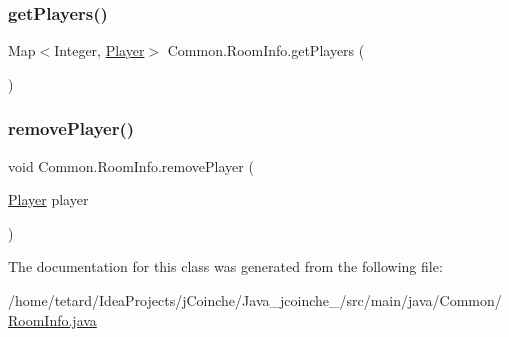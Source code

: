 \subsubsection{\texorpdfstring{get\+Players()}{getPlayers()}}
{\footnotesize\ttfamily Map$<$Integer, \mbox{\hyperlink{classCommon_1_1Player}{Player}}$>$ Common.\+Room\+Info.\+get\+Players (\begin{DoxyParamCaption}{ }\end{DoxyParamCaption})\hspace{0.3cm}{\ttfamily [inline]}}

\mbox{\label{classCommon_1_1RoomInfo_ab167bc6ee6568c92d8135622564887b9}} 
\subsubsection{\texorpdfstring{remove\+Player()}{removePlayer()}}
{\footnotesize\ttfamily void Common.\+Room\+Info.\+remove\+Player (\begin{DoxyParamCaption}\item[{\mbox{\hyperlink{classCommon_1_1Player}{Player}}}]{player }\end{DoxyParamCaption})\hspace{0.3cm}{\ttfamily [inline]}}



The documentation for this class was generated from the following file\+:\begin{DoxyCompactItemize}
\item 
/home/tetard/\+Idea\+Projects/j\+Coinche/\+Java\+\_\+jcoinche\+\_/src/main/java/\+Common/\mbox{\hyperlink{RoomInfo_8java}{Room\+Info.\+java}}\end{DoxyCompactItemize}
